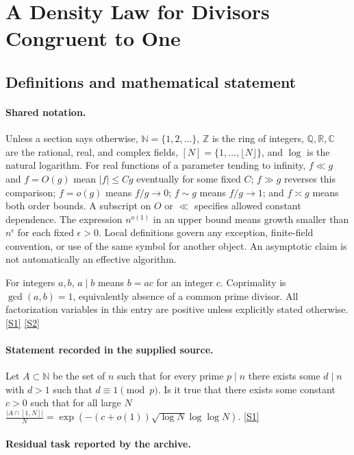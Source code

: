 \documentclass[11pt,a4paper]{article}
\newcommand{\N}{\mathbb{N}}
\newcommand{\Z}{\mathbb{Z}}
\newcommand{\Q}{\mathbb{Q}}
\newcommand{\R}{\mathbb{R}}
\newcommand{\C}{\mathbb{C}}
\newcommand{\sref}[2]{\hyperlink{source:#1:#2}{[S#2]}}
\begin{document}
\section{A Density Law for Divisors Congruent to One}\label{statement}


\subsection{Definitions and mathematical statement}

\paragraph{Shared notation.}Unless a section says otherwise, $\N=\{1,2,\ldots\}$,
$\Z$ is the ring of integers, $\Q,\R,\C$ are the rational, real, and complex
fields, $[N]=\{1,\ldots,\lfloor N\rfloor\}$, and $\log$ is the natural
logarithm. For real functions of a parameter tending to infinity,
$f\ll g$ and $f=O(g)$ mean $|f|\leq Cg$ eventually for some fixed $C$;
$f\gg g$ reverses this comparison; $f=o(g)$ means $f/g\to0$;
$f\sim g$ means $f/g\to1$; and $f\asymp g$ means both order bounds.
A subscript on $O$ or $\ll$ specifies allowed constant dependence.
The expression $n^{o(1)}$ in an upper bound means growth smaller than
$n^\epsilon$ for each fixed $\epsilon>0$. Local definitions govern any
exception, finite-field convention, or use of the same symbol for another
object. An asymptotic claim is not automatically an effective algorithm.



For integers $a,b$, $a\mid b$ means $b=ac$ for an integer $c$. Coprimality is $\gcd(a,b)=1$, equivalently absence of a common prime divisor. All factorization variables in this entry are positive unless explicitly stated otherwise. \sref{statement}{1} \sref{statement}{2}

\paragraph{Statement recorded in the supplied source.}
Let $A\subset\mathbb{N}$ be the set of $n$ such that for every prime $p\mid n$ there exists some $d\mid n$ with $d>1$ such that $d\equiv 1\pmod{p}$. Is it true that there exists some constant $c>0$ such that for all large $N$ $ \frac{\lvert A\cap [1,N]\rvert}{N}=\exp(-(c+o(1))\sqrt{\log N}\log\log N). $ \sref{statement}{1}

\paragraph{Residual task reported by the archive.}
\end{document}
